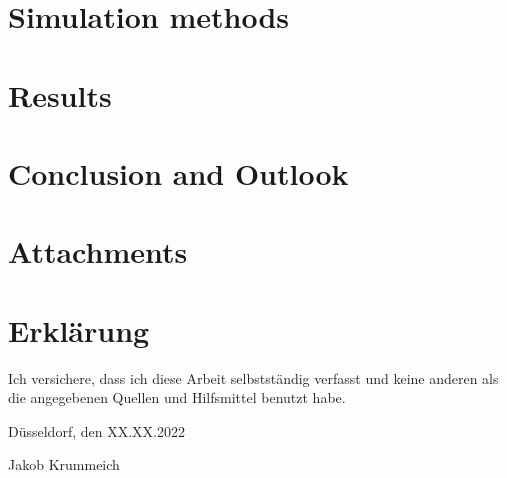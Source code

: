 \documentclass[DIV=9,11pt,BCOR=5mm,twoside=semi,abstract]{scrreprt}
\begin{document}

	\chapter{Simulation methods}
	\label{chap:simulation_methods}
	

	\chapter{Results}
	\label{chap:results}


\chapter{Conclusion and Outlook}
\label{chap:conclusion}


	\nocite{*}
	\begin{otherlanguage}{british}	%
		\printbibliography[title =Sources and References]
	\end{otherlanguage}

	
\chapter*{Attachments}




\chapter*{Erklärung}

Ich versichere, dass ich diese Arbeit selbstständig verfasst und keine anderen als die
angegebenen Quellen und Hilfsmittel benutzt habe. \vspace{2cm}


Düsseldorf, den XX.XX.2022

\vspace{2 cm}


Jakob Krummeich


	
\end{document}
